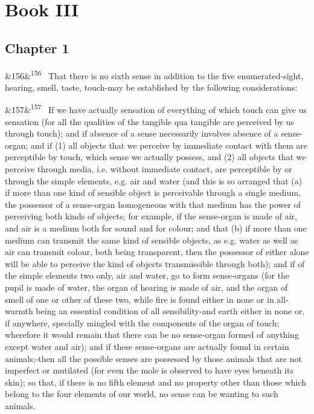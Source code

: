 \documentclass[12pt]{article}
\newcommand{\para}[1][]{\par\noindent\ifx&#1&\else\textsuperscript{\footnotesize #1}~\fi}
\begin{document}
\section*{Book III}

\subsection*{Chapter 1}

\para[156] That there is no sixth sense in addition to the five enumerated-sight, hearing, smell, taste, touch-may be established by the following considerations:

\para[157] If we have actually sensation of everything of which touch can give us sensation (for all the qualities of the tangible qua tangible are perceived by us through touch); and if absence of a sense necessarily involves absence of a sense-organ; and if (1) all objects that we perceive by immediate contact with them are perceptible by touch, which sense we actually possess, and (2) all objects that we perceive through media, i.e. without immediate contact, are perceptible by or through the simple elements, e.g. air and water (and this is so arranged that (a) if more than one kind of sensible object is perceivable through a single medium, the possessor of a sense-organ homogeneous with that medium has the power of perceiving both kinds of objects; for example, if the sense-organ is made of air, and air is a medium both for sound and for colour; and that (b) if more than one medium can transmit the same kind of sensible objects, as e.g. water as well as air can transmit colour, both being transparent, then the possessor of either alone will be able to perceive the kind of objects transmissible through both); and if of the simple elements two only, air and water, go to form sense-organs (for the pupil is made of water, the organ of hearing is made of air, and the organ of smell of one or other of these two, while fire is found either in none or in all-warmth being an essential condition of all sensibility-and earth either in none or, if anywhere, specially mingled with the components of the organ of touch; wherefore it would remain that there can be no sense-organ formed of anything except water and air); and if these sense-organs are actually found in certain animals;-then all the possible senses are possessed by those animals that are not imperfect or mutilated (for even the mole is observed to have eyes beneath its skin); so that, if there is no fifth element and no property other than those which belong to the four elements of our world, no sense can be wanting to such animals.
\end{document}
